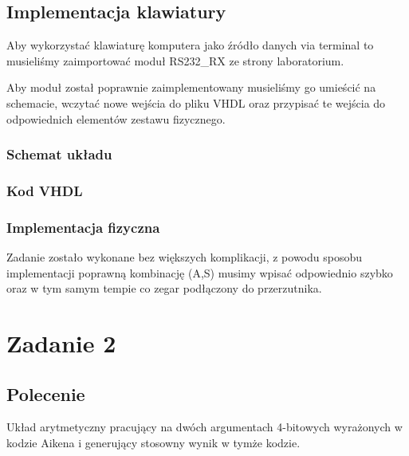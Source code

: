 \documentclass[a4paper,12pt]{extarticle}  %
\begin{document}
\subsection{Implementacja klawiatury}
Aby wykorzystać klawiaturę komputera jako źródło danych via terminal to musieliśmy zaimportować moduł RS232\_RX ze strony laboratorium.

Aby moduł został poprawnie zaimplementowany musieliśmy go umieścić na schemacie, wczytać nowe wejścia do pliku VHDL oraz przypisać te wejścia do odpowiednich elementów zestawu fizycznego.
\subsubsection{Schemat układu}
\begin{figure}[H]
	\centering
\end{figure}
\subsubsection{Kod VHDL}
% 
\subsubsection{Implementacja fizyczna}


Zadanie zostało wykonane bez większych komplikacji, z powodu sposobu implementacji poprawną kombinację (A,S) musimy wpisać odpowiednio szybko oraz w tym samym tempie co zegar podłączony do przerzutnika.
\section{Zadanie 2}
\subsection{Polecenie}
Układ arytmetyczny pracujący na dwóch argumentach 4-bitowych wyrażonych w kodzie Aikena
i generujący stosowny wynik w tymże kodzie. 
\end{document}
